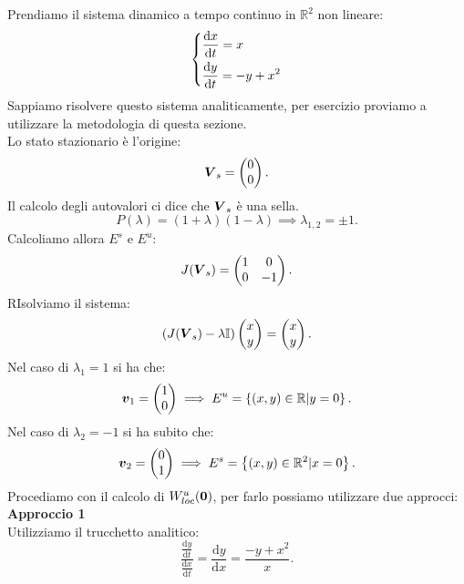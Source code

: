 \begin{exmp}[]
    Prendiamo il sistema dinamico a tempo continuo in $\mathbb{R}^2$ non lineare:
    \[
    \begin{dcases}
    \frac{\text{d} x}{\text{d} t} = x \\
    \frac{\text{d} y}{\text{d} t} = -y + x^2
    \end{dcases}
    \]
    Sappiamo risolvere questo sistema analiticamente, per esercizio proviamo a utilizzare la metodologia di questa sezione. \\
    Lo stato stazionario è l'origine:
    \[
        \boldsymbol{V}_s = \begin{pmatrix} 0 \\ 0 \end{pmatrix}
    .\] 
    Il calcolo degli autovalori ci dice che $\boldsymbol{V}_s $ è una sella.
    \[
	P(\lambda) = (1 + \lambda) (1 - \lambda) \implies  \lambda_{1, 2} = \pm 1
    .\] 
    Calcoliamo allora $E^s$ e $E^u$:
    \[
	J(\boldsymbol{V}_s) = 
    \begin{pmatrix}
	1  & 0 \\
	0 & -1 \\
    \end{pmatrix}
    .\] 
    RIsolviamo il sistema:
    \[
	(J(\boldsymbol{V}_s) - \lambda \mathbb{I})
	\begin{pmatrix} x \\ y \end{pmatrix} = \begin{pmatrix} x \\ y \end{pmatrix}
    .\] 
    Nel caso di $\lambda_1 = 1$ si ha che:
    \[
	\boldsymbol{v}_1 = \begin{pmatrix} 1 \\ 0 \end{pmatrix} \implies  E^u = \left\{(x, y) \in \mathbb{R} | y = 0\right\}
    .\] 
    Nel caso di $\lambda_2 = -1$ si ha subito che:
    \[
	\boldsymbol{v}_2 = \begin{pmatrix} 0 \\ 1 \end{pmatrix} \implies  E^s = \left\{(x, y) \in \mathbb{R}^2 | x = 0\right\}
    .\] 
    Procediamo con il calcolo di $W^u_{loc}(\boldsymbol{0})$, per farlo possiamo utilizzare due approcci:\\
    \textbf{Approccio 1}\\
    Utilizziamo il trucchetto analitico:
    \[
	\frac{\frac{\text{d} y}{\text{d} t}}{\frac{\text{d} x}{\text{d} t} } = \frac{\text{d} y}{\text{d} x} = \frac{-y + x^2}{x}
    .\] 

\end{exmp}
